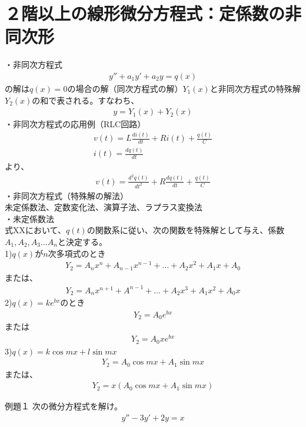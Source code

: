 \documentclass{jsarticle}
\begin{document}
\section{２階以上の線形微分方程式：定係数の非同次形}
・非同次方程式
\begin{eqnarray}
y''+a_1y'+a_2y=q(x)
\end{eqnarray}
の解は$q(x)=0$の場合の解（同次方程式の解）$Y_1(x)$と非同次方程式の特殊解$Y_2(x)$の和で表される。すなわち、
\begin{eqnarray}
y=Y_1(x)+Y_2(x)
\end{eqnarray}
・非同次方程式の応用例（RLC回路）
\begin{eqnarray}
v(t)=L\frac{di(t)}{dt}+Ri(t)+\frac{q(t)}{C}\\
i(t)=\frac{dq(t)}{dt}
\end{eqnarray}
より、
\begin{eqnarray}
v(t)=\frac{d^2q(t)}{dt^2}+R\frac{dq(t)}{dt}+\frac{q(t)}{C}
\end{eqnarray}
・非同次方程式（特殊解の解法）\\
未定係数法、定数変化法、演算子法、ラプラス変換法\\
・未定係数法\\
式XXにおいて、$q(t)$の関数系に従い、次の関数を特殊解として与え、係数$A_1,A_2,A_3...A_n$と決定する。\\
1)$q(x)$が$n$次多項式のとき
\begin{eqnarray}
Y_2=A_nx^n+A_{n-1}x^{n-1}+…+A_2x^2+A_1x+A_0
\end{eqnarray}
または、
\begin{eqnarray}
Y_2=A_nx^{n+1}+A^{n-1}+…+A_2x^3+A_1x^2+A_0x
\end{eqnarray}
2)$q(x)=ke^{bx}$のとき
\begin{eqnarray}
Y_2=A_0e^{bx}
\end{eqnarray}
または
\begin{eqnarray}
Y_2=A_0xe^{bx}
\end{eqnarray}
3)$q(x)=k\cos mx + l\sin mx$
\begin{eqnarray}
Y_2=A_0\cos mx+A_1\sin mx
\end{eqnarray}
または、
\begin{eqnarray}
Y_2=x(A_0\cos mx+A_1\sin mx)
\end{eqnarray}
\begin{itembox}[l]{例題１}
次の微分方程式を解け。
\begin{eqnarray}
y''-3y'+2y=x
\end{eqnarray}
\end{itembox}
\end{document}
